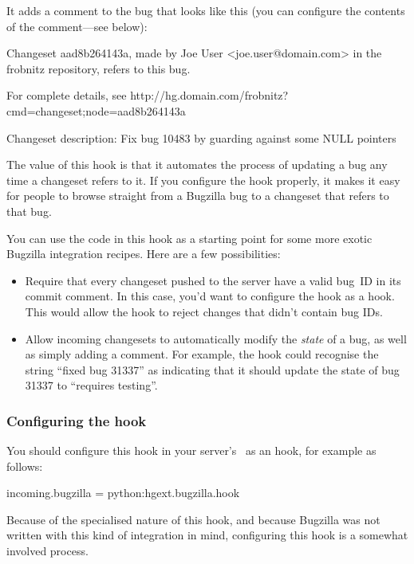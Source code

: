 It adds a comment to the bug that looks like this (you can configure
the contents of the comment---see below):
\begin{codesample2}
  Changeset aad8b264143a, made by Joe User <joe.user@domain.com> in
  the frobnitz repository, refers to this bug.

  For complete details, see
  http://hg.domain.com/frobnitz?cmd=changeset;node=aad8b264143a

  Changeset description:
        Fix bug 10483 by guarding against some NULL pointers
\end{codesample2}
The value of this hook is that it automates the process of updating a
bug any time a changeset refers to it.  If you configure the hook
properly, it makes it easy for people to browse straight from a
Bugzilla bug to a changeset that refers to that bug.

You can use the code in this hook as a starting point for some more
exotic Bugzilla integration recipes.  Here are a few possibilities:
\begin{itemize}
\item Require that every changeset pushed to the server have a valid
  bug~ID in its commit comment.  In this case, you'd want to configure
  the hook as a  hook.  This would allow the hook
  to reject changes that didn't contain bug IDs.
\item Allow incoming changesets to automatically modify the
  \emph{state} of a bug, as well as simply adding a comment.  For
  example, the hook could recognise the string ``fixed bug 31337'' as
  indicating that it should update the state of bug 31337 to
  ``requires testing''.
\end{itemize}

\subsubsection{Configuring the  hook}
\label{sec:hook:bugzilla:config}

You should configure this hook in your server's \hgrc\ as an
 hook, for example as follows:
\begin{codesample2}
  [hooks]
  incoming.bugzilla = python:hgext.bugzilla.hook
\end{codesample2}

Because of the specialised nature of this hook, and because Bugzilla
was not written with this kind of integration in mind, configuring
this hook is a somewhat involved process.


